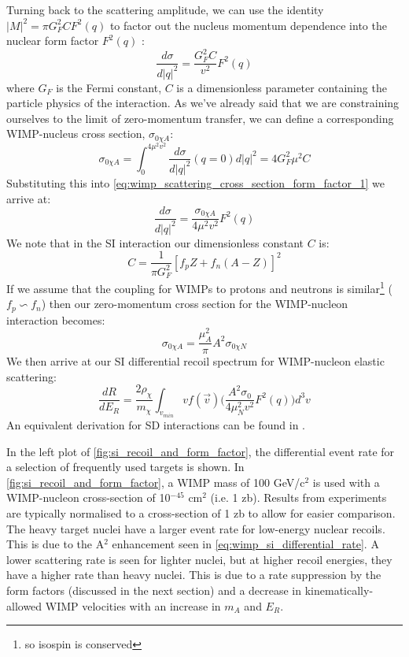 \par
Turning back to the scattering amplitude, we can use the identity $|M|^2=\pi G^2_F C F^2(q)$ to factor out the nucleus momentum dependence into the nuclear form factor $F^2(q)$ \cite{introduction_to_elementary_particles_ref}:
\begin{equation}
    \frac{d\sigma}{d|q|^2} = \frac{G^2_F C}{v^2} F^2(q)
    \label{eq:wimp_scattering_cross_section_form_factor_1}
\end{equation}
where $G_F$ is the Fermi constant, $C$ is a dimensionless parameter containing the particle physics of the interaction.
As we've already said that we are constraining ourselves to the limit of zero-momentum transfer, we can define a corresponding WIMP-nucleus cross section, $\sigma_{0 \chi A}$:
\begin{equation}
    \sigma_{0 \chi A} = \int^{4\mu^2 v^2}_{0} \frac{d\sigma}{d|q|^2}(q=0) d|q|^2 = 4G^2_F \mu^2 C
\end{equation}
Substituting this into \autoref{eq:wimp_scattering_cross_section_form_factor_1} we arrive at:
\begin{equation}
    \frac{d\sigma}{d|q|^2} = \frac{\sigma_{0 \chi A}}{4 \mu^2 v^2} F^2(q)
    \label{eq:wimp_scattering_cross_section_form_factor_2}
\end{equation}
We note that in the SI interaction our dimensionless constant $C$ is:
\begin{equation}
    C = \frac{1}{\pi G^2_F} [f_pZ + f_n (A-Z)]^2
\end{equation}
If we assume that the coupling for WIMPs to protons and neutrons is similar\footnote{so isospin is conserved} ($f_p \backsim f_n$) then our zero-momentum cross section for the WIMP-nucleon interaction becomes:
\begin{equation}
    \sigma_{0 \chi A} = \frac{\mu^2_A}{\pi} A^2 \sigma_{0 \chi N}
\end{equation}
We then arrive at our SI differential recoil spectrum for WIMP-nucleon elastic scattering:
\begin{equation}
    \frac{dR}{dE_R} = \frac{2 \rho_\chi}{m_\chi} \int_{v_{min}} v f(\vec{v}) \bigg(\frac{A^2 \sigma_0}{4 \mu^2_N v^2} F^2(q) \bigg) d^3v
    \label{eq:wimp_si_differential_rate}
\end{equation}
An equivalent derivation for SD interactions can be found in \cite{wimp_theory_ref}.
\par
In the left plot of \autoref{fig:si_recoil_and_form_factor}, the differential event rate for a selection of frequently used targets is shown.
In \autoref{fig:si_recoil_and_form_factor}, a WIMP mass of 100 GeV/c$^2$ is used with a WIMP-nucleon cross-section of 10$^{-45}$ cm$^2$ (i.e. 1 zb).
Results from experiments are typically normalised to a cross-section of 1 zb to allow for easier comparison.
The heavy target nuclei have a larger event rate for low-energy nuclear recoils.
This is due to the A$^2$ enhancement seen in \autoref{eq:wimp_si_differential_rate}.
A lower scattering rate is seen for lighter nuclei, but at higher recoil energies, they have a higher rate than heavy nuclei.
This is due to a rate suppression by the form factors (discussed in the next section) and a decrease in kinematically-allowed WIMP velocities with an increase in $m_A$ and $E_R$.

